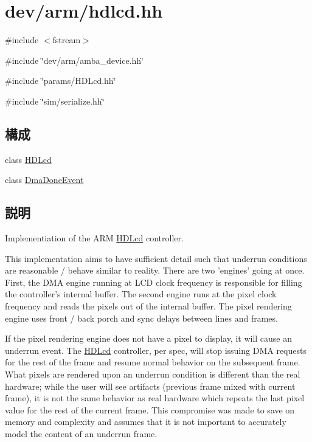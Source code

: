 \hypertarget{hdlcd_8hh}{
\section{dev/arm/hdlcd.hh}
\label{hdlcd_8hh}
}
{\ttfamily \#include $<$fstream$>$}\par
{\ttfamily \#include \char`\"{}dev/arm/amba\_\-device.hh\char`\"{}}\par
{\ttfamily \#include \char`\"{}params/HDLcd.hh\char`\"{}}\par
{\ttfamily \#include \char`\"{}sim/serialize.hh\char`\"{}}\par
\subsection*{構成}
\begin{DoxyCompactItemize}
\item 
class \hyperlink{classHDLcd}{HDLcd}
\item 
class \hyperlink{classHDLcd_1_1DmaDoneEvent}{DmaDoneEvent}
\end{DoxyCompactItemize}


\subsection{説明}
Implementiation of the ARM \hyperlink{classHDLcd}{HDLcd} controller.

This implementation aims to have sufficient detail such that underrun conditions are reasonable / behave similar to reality. There are two 'engines' going at once. First, the DMA engine running at LCD clock frequency is responsible for filling the controller's internal buffer. The second engine runs at the pixel clock frequency and reads the pixels out of the internal buffer. The pixel rendering engine uses front / back porch and sync delays between lines and frames.

If the pixel rendering engine does not have a pixel to display, it will cause an underrun event. The \hyperlink{classHDLcd}{HDLcd} controller, per spec, will stop issuing DMA requests for the rest of the frame and resume normal behavior on the subsequent frame. What pixels are rendered upon an underrun condition is different than the real hardware; while the user will see artifacts (previous frame mixed with current frame), it is not the same behavior as real hardware which repeats the last pixel value for the rest of the current frame. This compromise was made to save on memory and complexity and assumes that it is not important to accurately model the content of an underrun frame.

